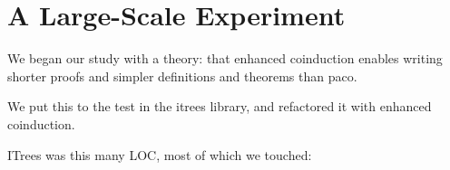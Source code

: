 \section{A Large-Scale Experiment}
\label{sec:experiment}

We began our study with a theory: that enhanced coinduction enables writing
shorter proofs and simpler definitions and theorems than paco.

We put this to the test in the itrees library, and refactored it with enhanced
coinduction.

ITrees was this many LOC, most of which we touched:
